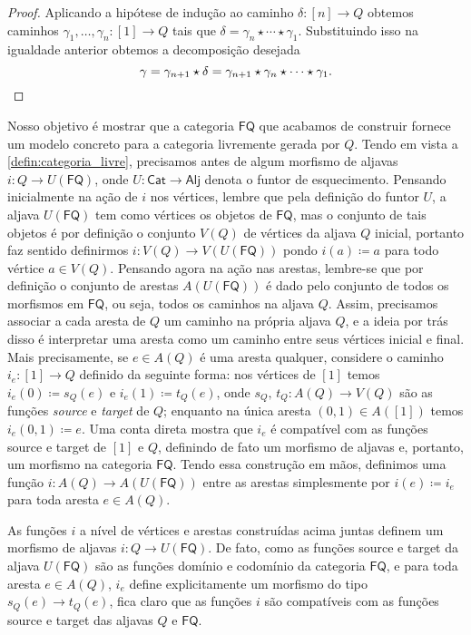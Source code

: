 \begin{proof}
    Aplicando a hipótese de indução ao caminho $\delta: [n] \to Q$ obtemos caminhos $\gamma_1, \dots, \gamma_n: [1] \to Q$ tais que $\delta = \gamma_n \star \dotsm \star \gamma_1$.
    Substituindo isso na igualdade anterior obtemos a decomposição desejada
    \begin{displaymath}
        \gamma = \gamma_{n+1} \star \delta
        = \gamma_{n+1} \star \gamma_n \star \dotsm \star \gamma_1. \qedhere
    \end{displaymath}
\end{proof}

Nosso objetivo é mostrar que a categoria $\mathsf{FQ}$ que acabamos de construir fornece um modelo concreto para a categoria livremente gerada por $Q$.
Tendo em vista a \cref{defin:categoria_livre}, precisamos antes de algum morfismo de aljavas $i: Q \to U(\mathsf{FQ})$, onde $U: \mathsf{Cat} \to \mathsf{Alj}$ denota o funtor de esquecimento.
Pensando inicialmente na ação de $i$ nos vértices, lembre que pela definição do funtor $U$, a aljava $U(\mathsf{FQ})$ tem como vértices os objetos de $\mathsf{FQ}$, mas o conjunto de tais objetos é por definição o conjunto $V(Q)$ de vértices da aljava $Q$ inicial, portanto faz sentido definirmos $i: V(Q) \to V(U(\mathsf{FQ}))$ pondo $i(a) \coloneqq a$ para todo vértice $a \in V(Q)$.
Pensando agora na ação nas arestas, lembre-se que por definição o conjunto de arestas $A(U(\mathsf{FQ}))$ é dado pelo conjunto de todos os morfismos em $\mathsf{FQ}$, ou seja, todos os caminhos na aljava $Q$.
Assim, precisamos associar a cada aresta de $Q$ um caminho na própria aljava $Q$, e a ideia por trás disso é interpretar uma aresta como um caminho entre seus vértices inicial e final.
Mais precisamente, se $e \in A(Q)$ é uma aresta qualquer, considere o caminho $i_e: [1] \to Q$ definido da seguinte forma: nos vértices de $[1]$ temos $i_e(0) \coloneqq s_Q(e)$ e $i_e(1) \coloneqq t_Q(e)$, onde $s_Q,\,t_Q: A(Q) \to V(Q)$ são as funções \emph{source} e \emph{target} de $Q$; enquanto na única aresta $(0,1) \in A([1])$ temos $i_e(0,1) \coloneqq e$.
Uma conta direta mostra que $i_e$ é compatível com as funções source e target de $[1]$ e $Q$, definindo de fato um morfismo de aljavas e, portanto, um morfismo na categoria $\mathsf{FQ}$.
Tendo essa construção em mãos, definimos uma função $i: A(Q) \to A(U(\mathsf{FQ}))$ entre as arestas simplesmente por $i(e) \coloneqq i_e$ para toda aresta $e \in A(Q)$.

As funções $i$ a nível de vértices e arestas construídas acima juntas definem um morfismo de aljavas $i: Q \to U(\mathsf{FQ})$.
De fato, como as funções source e target da aljava $U(\mathsf{FQ})$ são as funções domínio e codomínio da categoria $\mathsf{FQ}$, e para toda aresta $e \in A(Q)$, $i_e$ define explicitamente um morfismo do tipo $s_Q(e) \to t_Q(e)$, fica claro que as funções $i$ são compatíveis com as funções source e target das aljavas $Q$ e $\mathsf{FQ}$.


